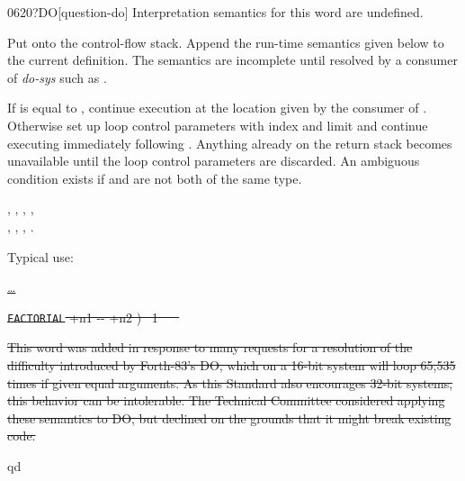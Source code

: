 \begin{worddef}[qDO]{0620}{?DO}[question-do]
\interpret
	Interpretation semantics for this word are undefined.

\compile

	Put  onto the control-flow stack. Append the
	run-time semantics given below to the current definition. The
	semantics are incomplete until resolved by a consumer of
	\emph{do-sys} such as .

\runtime

	If  is equal to , continue
	execution at the location given by the consumer of
	. Otherwise set up loop control parameters with
	index  and limit  and continue
	executing immediately following . Anything already
	on the return stack becomes unavailable until the loop
	control parameters are discarded. An ambiguous condition
	exists if  and  are not both of
	the same type.

\see {},
	,
	,
	, \\
	,
	,
	,
	.

	\begin{rationale} %
		Typical use:

\cbstart{}
		\tab \uline{ {\ldots} }

		\tab \sout{\word{:} \texttt{FACTORIAL}  +n1 -{}- +n2 )~
			1   ~
				 \word{*}~
		\word{;}}

\sout{%
		This word was added in response to many requests for a
		resolution of the difficulty introduced by Forth-83's DO,
		which on a 16-bit system will loop 65,535 times if given
		equal arguments. As this Standard also encourages 32-bit
		systems, this behavior can be intolerable. The Technical
		Committee considered applying these semantics to DO, but
		declined on the grounds that it might break existing code.}
\cbend
	\end{rationale}

	\begin{testing}\ttfamily

	\word{:} qd    \word{;} \\
	 \\
	 \\


\end{testing}
\end{worddef}
